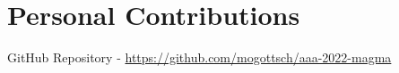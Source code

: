 \clearpage
\section{Personal Contributions}
\label{sec:personal_contributions}

GitHub Repository - \href{https://github.com/mogottsch/aaa-2022-magma}{https://github.com/mogottsch/aaa-2022-magma}
